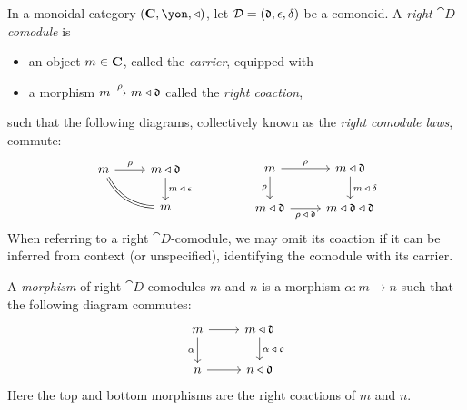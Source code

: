\documentclass[Book-Poly]{subfiles}
\begin{document}
\begin{definition}\label{def.right_comod}
In a monoidal category $(\Cat{C},\yon,\tri)$, let $\mathcal{D}=(\mathfrak{d},\epsilon,\delta)$ be a comonoid.
A \emph{right $\cat{D}$-comodule} is
\begin{itemize}
    \item an object $m\in\mathbf{C}$, called the \emph{carrier}, equipped with
    \item a morphism $m\xrightarrow{\rho}m\mathbin{\triangleleft}\mathfrak{d}$ called the \emph{right coaction},
\end{itemize}
such that the following diagrams, collectively known as the \emph{right comodule laws}, commute:
\begin{equation} \label{eqn.right_comod_laws}
\begin{tikzcd}[ampersand replacement=\&]
	m\ar[r, "\rho"]\ar[dr, equal, bend right]\&
	m\tri\car{d}\ar[d, "m\:\tri\:\epsilon"]\\\&
	m
\end{tikzcd}
\hspace{.6in}
\begin{tikzcd}[ampersand replacement=\&]
	m\ar[r, "\rho"]\ar[d, "\rho"']\&
	m\tri\car{d}\ar[d, "m\:\tri\:\delta"]\\
	m\tri\car{d}\ar[r, "\rho\:\tri\:\car{d}"']\&
	m\tri\car{d}\tri\car{d}
\end{tikzcd}
\end{equation}
When referring to a right $\cat{D}$-comodule, we may omit its coaction if it can be inferred from context (or unspecified), identifying the comodule with its carrier.

A \emph{morphism} of right $\cat{D}$-comodules $m$ and $n$ is a morphism $\alpha\colon m\to n$ such that the following diagram commutes:
\[
\begin{tikzcd}
	m \ar[r] \ar[d, "\alpha"'] &
	m\tri\car{d} \ar[d, "\alpha\:\tri\:\car{d}"] \\
	n \ar[r] &
	n\tri\car{d}
\end{tikzcd}
\]
Here the top and bottom morphisms are the right coactions of $m$ and $n$.
\end{definition}
\end{document}
